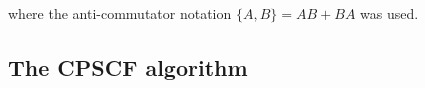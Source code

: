 \documentclass[prl,aps,letterpaper,twocolumn,showpacs,twocolumngrid,superbib]{revtex4}
\def\D{\mathcal{D}}
\begin{document}
where the anti-commutator notation $\{A,B\} = AB+BA$
was used.

\subsection{The CPSCF algorithm}
\end{document}
